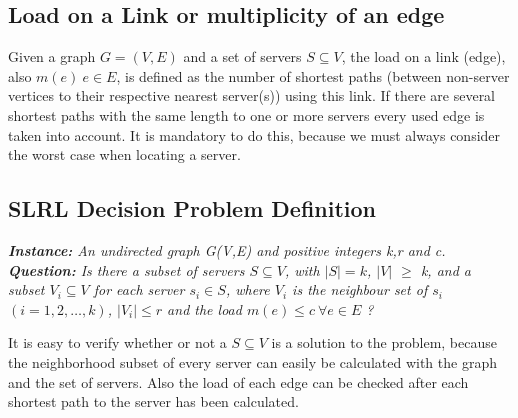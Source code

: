 \documentclass [12pt]{article}
\newtheorem{mydef}{Definition}
\begin{document}
\subsection{Load on a Link or multiplicity of an edge}
Given a graph $G=(V,E)$ and a set of servers $S \subseteq V$, the load on a link (edge), also $m(e) \ e \in E$, is defined as the number of 
shortest paths (between non-server vertices to their respective nearest server(s)) using this link. If there
are several shortest paths with the same length to one or more servers every
used edge is taken into account. It is mandatory to do this, because we must always consider
the worst case when locating a server. 
\subsection{SLRL Decision Problem Definition}

{\itshape \textbf{Instance:} An undirected graph G(V,E) and  positive integers k,r and c.\\
  \textbf{Question:} 
  Is there a subset of servers $S \subseteq V$, with $|S| = k$, $|V|$ $\geq$ k,
  and a subset $V_i \subseteq V$ for each server $s_i \in S$, where $V_i$ is the neighbour set of $s_i$ $(i=1,2,\dots,k)$, $|V_i| \leq r$ 
and the load $m(e) \leq c \ \forall e \in E$ ?}
\medskip

\noindent
It is easy to verify whether or not a $S \subseteq V$ is a solution to the problem, because the neighborhood subset
of every server can easily be calculated with the graph and the set of servers. Also the load of each edge
can be checked after each shortest path to the server has been calculated.
\end{document}
